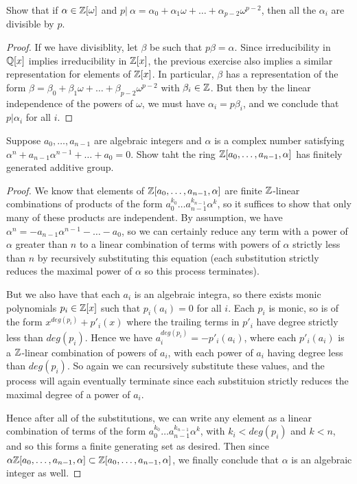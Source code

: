\documentclass[11pt]{article}
\begin{document}
  
Show that if $\alpha \in \mathbb{Z}[\omega]$ and $p |\ \alpha = \alpha_0 + \alpha_1\omega + \dots + \alpha_{p-2}\omega^{p-2}$, then all the $\alpha_i$ are divisible by $p$.

\begin{proof}
  If we have divisiblity, let $\beta$ be such that $p\beta = \alpha$.
  Since irreducibility in $\mathbb{Q}[x]$ implies irreducibility in $\mathbb{Z}[x]$, the previous exercise also implies a similar representation for elements of $\mathbb{Z}[x]$.
  In particular, $\beta$ has a representation of the form $\beta = \beta_0 + \beta_1\omega + \dots + \beta_{p-2}\omega^{p-2}$ with $\beta_i \in \mathbb{Z}$.
  But then by the linear independence of the powers of $\omega$, we must have $\alpha_i = p\beta_i$, and we conclude that $p | \alpha_i$ for all $i$.
\end{proof}

Suppose $a_0, \dots, a_{n-1}$ are algebraic integers and $\alpha$ is a complex number satisfying $\alpha^n + a_{n-1}\alpha^{n-1} + \dots + a_0 = 0$. Show taht the ring $\mathbb{Z}[a_0, \dots, a_{n-1}, \alpha]$ has finitely generated additive group.

\begin{proof}
  We know that elements of $\mathbb{Z}[a_0, \dots, a_{n-1}, \alpha]$ are finite $\mathbb{Z}$-linear combinations of products of the form $a_0^{k_0} \dots a_{n-1}^{k_{n-1}} \alpha^k$, so it suffices to show that only many of these products are independent.
  By assumption, we have $\alpha^n = -a_{n-1}\alpha^{n-1} - \dots - a_0$, so we can certainly reduce any term with a power of $\alpha$ greater than $n$ to a linear combination of terms with powers of $\alpha$ strictly less than $n$ by recursively substituting this equation (each substitution strictly reduces the maximal power of $\alpha$ so this process terminates).

  But we also have that each $a_i$ is an algebraic integra, so there exists monic polynomials $p_i \in \mathbb{Z}[x]$ such that $p_i(a_i) = 0$ for all $i$.
  Each $p_i$ is monic, so is of the form $x^{deg(p_i)} + p'_i(x)$ where the trailing terms in $p'_i$ have degree strictly less than $deg(p_i)$.
  Hence we have $a_i^{deg(p_i)} = - p'_i(a_i)$, where each $p'_i(a_i)$ is a $\mathbb{Z}$-linear combination of powers of $a_i$, with each power of $a_i$ having degree less than $deg(p_i)$.
  So again we can recursively substitute these values, and the process will again eventually terminate since each substituion strictly reduces the maximal degree of a power of $a_i$.

  Hence after all of the substitutions, we can write any element as a linear combination of terms of the form $a_0^{k_0} \dots a_{n-1}^{k_{n-1}} \alpha^k$, with $k_i < deg(p_i)$ and $k < n$, and so this forms a finite generating set as desired.
  Then since $\alpha \mathbb{Z}[a_0, \dots, a_{n-1}, \alpha] \subset \mathbb{Z}[a_0, \dots, a_{n-1}, \alpha]$, we finally conclude that $\alpha$ is an algebraic integer as well.
\end{proof}
\end{document}
